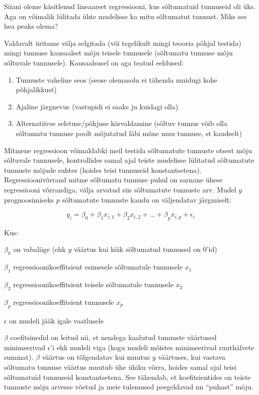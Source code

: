 \documentclass[
]{book}
\providecommand{\tightlist}{%
  \setlength{\itemsep}{0pt}\setlength{\parskip}{0pt}}
\begin{document}
Siiani oleme käsitlenud lineaarset regressiooni, kus sõltumatuid tunnuseid oli üks. Aga on võimalik lülitada ühte mudelisse ka mitu sõltumatut tunnust. Miks see hea peaks olema?

Valdavalt üritame välja selgitada (või tegelikult mingi teooria põhjal testida) mingi tunnuse kausaalset mõju teisele tunnusele (sõltumatu tunnuse mõju sõltuvale tunnusele). Kausaalsusel on aga teatud eeldused:

\begin{enumerate}
\def\labelenumi{\arabic{enumi}.}
\tightlist
\item
  Tunnuste vaheline seos (seose olemasolu ei tähenda muidugi kohe põhjalikkust)\\
\item
  Ajaline järgnevus (vastupidi ei saaks ju kuidagi olla)\\
\item
  Alternatiivse seletuse/põhjuse kõrvaldamine (sõltuv tunnus võib olla sõltumatu tunnuse poolt mõjutatud läbi mõne muu tunnuse, st kaudselt)
\end{enumerate}

Mitmene regressioon võimaldabki meil testida sõltumatute tunnuste otsest mõju sõltuvale tunnusele, kontrollides samal ajal teiste mudelisse lülitatud sõltumatute tunnuste mõjude suhtes (hoides teisi tunnuseid konstantsetena). Regressioonivõrrand mitme sõltumatu tunnuse puhul on sarnane ühese regressiooni võrrandiga, välja arvatud siis sõltumatute tunnuste arv. Mudel \(y\) prognoosimiseks \(p\) sõltumatute tunnuste kaudu on väljendatav järgmiselt:

\begin{equation}  
y_{i}=\beta_{0}+\beta_{1}x_{i,1}+\beta_{2}x_{i,2}+\ldots+\beta_{p}x_{i,p}+\epsilon_{i}
\end{equation}

Kus:

\(\beta_0\) on vabaliige (ehk \(y\) väärtus kui kõik sõltumatud tunnused on \(0\)'id)

\(\beta_1\) regressioonikoeffitsient esimesele sõltumatule tunnusele \(x_1\)

\(\beta_2\) regressioonikoeffitsient teisele sõltumatule tunnusele \(x_2\)

\(\beta_{p}\) regressioonikoeffitsient tunnusele \(x_{p}\)

\(\epsilon\) on mudeli jääk igale vaatlusele

\(\beta\) coefitsinedid on leitud nii, et nendega kaalutud tunnuste väärtused minimeerivad \(\epsilon\)'i ehk mudeli viga (kogu mudeli mõistes minimeerivad ruuthälvete summat). \(\beta\) väärtus on tõlgendatav kui muutus \(y\) väärtuses, kui vastava sõltumatu tunnuse väärtus muutub ühe ühiku võrra, hoides samal ajal teisi sõltumatuid tunnuseid konstantsetena. See tähendab, et koefitsientides on teiste tunnuste mõju arvesse võetud ja meie tulemused peegeldavad nn ``puhast'' mõju.
\end{document}
